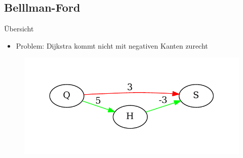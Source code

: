 \subsection{Belllman-Ford}
\begin{frame}{Übersicht}

\begin{itemize}
\itemsep1pt\parskip0pt
\item
  Problem: Dijkstra kommt nicht mit negativen Kanten zurecht
\end{itemize}

\begin{figure}[htbp]
\centering
\includegraphics[width=\linewidth]{dijkstra_gegenbeispiel.pdf}
\end{figure}

\end{frame}

